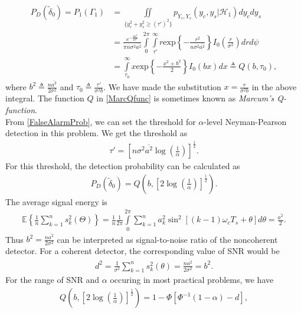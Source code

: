 \documentclass[12pt]{report}
\begin{document}
	\begin{align}
	 P_D(\tilde{\delta}_0) = P_1\left(\Gamma_1\right) &= \iint\limits_{\{y_c^2 + y_s^2 \ge (\tau')^2\}} p_{Y_c, Y_s}\left(y_c, y_s | \mathcal{H}_1\right) dy_c dy_s \nonumber\\
	 &= \frac{e^{-\frac{n\overline{a^2}}{4\sigma^2}}}{\pi n \sigma^2 \overline{a^2}} \int\limits_0^{2\pi} \int\limits_{\tau'}^{\infty}r \text{exp}\left\{-\frac{r^2}{n \sigma^2 \overline{a^2}}\right\} I_0\left(\frac{r}{\sigma^2}\right) dr d\psi \nonumber\\
	 &= \int\limits_{\tau_0}^{\infty} x \text{exp}\left\{-\frac{x^2+b^2}{2}\right\} I_0\left(bx\right)dx \triangleq Q\left(b, \tau_0\right), \label{MarcQfunc}
	\end{align}
	where $b^2 \triangleq \frac{n\overline{a^2}}{2\sigma^2}$ and $\tau_0 \triangleq \frac{\tau'}{\sigma^2 b}$. We have made the substitution $x = \frac{r}{\sigma^2 b}$ in the above integral.
	The function $Q$ in \eqref{MarcQfunc} is sometimes known as \textit{Marcum's Q-function}.\\
	From \eqref{FalseAlarmProb}, we can set the threshold for $\alpha$-level Neyman-Pearson detection in this problem. We get the threshold as
	\begin{align}
	 \tau' = \left[n \sigma^2 \overline{a^2}\operatorname*{log}\left(\frac{1}{\alpha}\right)\right]^\frac12.
	\end{align}
	For this threshold, the detection probability can be calculated as
	\begin{align}
	 P_D(\tilde{\delta}_0) = Q\left(b, \left[2 \operatorname*{log}\left(\frac{1}{\alpha}\right)\right]^\frac12\right).
	\end{align}
	The average signal energy is
	\begin{align}
	 \mathbb{E}\left\{\frac{1}{n}\sum_{k=1}^n s_k^2(\Theta)\right\} = \frac{1}{n} \frac{1}{2\pi} \int\limits_0^{2\pi} \sum_{k=1}^n a_k^2 \sin^2\left[\left(k-1\right)\omega_c T_s + \theta\right] d\theta = \frac{\overline{a^2}}{2}.
	\end{align}
	Thus $b^2 = \frac{n \overline{a^2}}{2 \sigma^2}$ can be interpreted as signal-to-noise ratio of the noncoherent detector. For a coherent detector, the corresponding
	value of SNR would be
	\begin{align}
	 d^2 = \frac{1}{\sigma^2} \sum_{k=1}^n s_k^2\left(\theta\right) = \frac{n \overline{a^2}}{2\sigma^2} = b^2.
	\end{align}
	For the range of SNR and $\alpha$ occuring in most practical problems, we have
	\begin{align}
	 Q\left(b, \left[2 \operatorname*{log}\left(\frac{1}{\alpha}\right)\right]^\frac12\right) = 1 - \Phi\left[\Phi^{-1}\left(1-\alpha\right) - d\right],
	\end{align}
\end{document}
